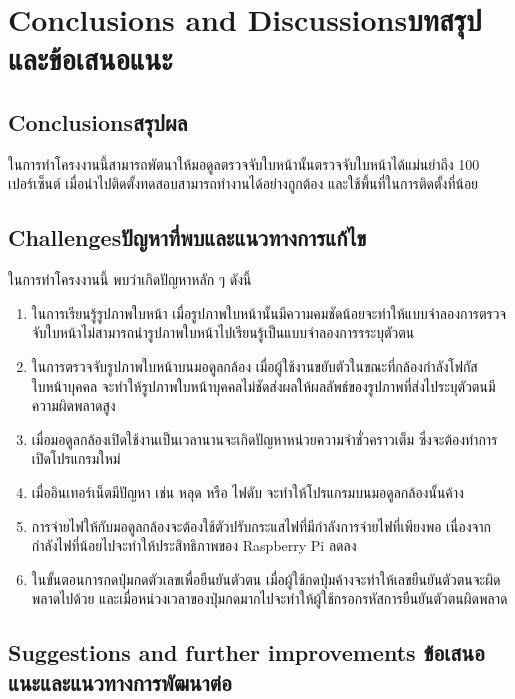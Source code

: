 \chapter{\ifenglish Conclusions and Discussions\else บทสรุปและข้อเสนอแนะ\fi}

\section{\ifenglish Conclusions\else สรุปผล\fi}

ในการทำโครงงานนี้สามารถพัตนาให้มอดูลตรวจจับใบหน้านั้นตรวจจับใบหน้าได้แม่นยำถึง 100 เปอร์เซ็นต์ เมื่อนำไปติดตั้งทดสอบสามารถทำงานได้อย่างถูกต้อง
และใช้พึ้นที่ในการติดตั้งที่น้อย


\section{\ifenglish Challenges\else ปัญหาที่พบและแนวทางการแก้ไข\fi}

ในการทำโครงงานนี้ พบว่าเกิดปัญหาหลัก ๆ ดังนี้
\begin{enumerate}
    \item ในการเรียนรู้รูปภาพใบหน้า เมื่อรูปภาพใบหน้านั้นมีความคมชัดน้อยจะทำให้แบบจำลองการตรวจจับใบหน้าไม่สามารถนำรูปภาพใบหน้าไปเรียนรู้เป็นแบบจำลองการรระบุตัวตน
    \item ในการตรวจจับรูปภาพใบหน้าบนมอดูลกล้อง เมื่อผู้ใช้งานขยับตัวในขณะที่กล้องกำลังโฟกัสใบหน้าบุคคล จะทำให้รูปภาพใบหน้าบุคคลไม่ชัดส่งผลให้ผลลัพธ์ของรูปภาพที่ส่งไประบุตัวตนมีความผิดพลาดสูง
    \item เมื่อมอดูลกล้องเปิดใช้งานเป็นเวลานานจะเกิดปัญหาหน่วยความจำชั่วคราวเต็ม ซึ่งจะต้องทำการเปิดโปรแกรมใหม่
    \item เมื่ออินเทอร์เน็ตมีปัญหา เช่น หลุด หรือ ไฟดับ จะทำให้โปรแกรมบนมอดูลกล้องนั้นค้าง
    \item การจ่ายไฟให้กับมอดูลกล้องจะต้องใช้ตัวปรับกระแสไฟที่มีกำลังการจ่ายไฟที่เพียงพอ เนื่องจากกำลังไฟที่น้อยไปจะทำให้ประสิทธิภาพของ Raspberry Pi ลดลง
    \item ในขั้นตอนการกดปุ่มกดตัวเลขเพื่อยืนยันตัวตน เมื่อผู้ใช้กดปุ่มค้างจะทำให้เลขยืนยันตัวตนจะผิดพลาดไปด้วย และเมื่อหน่วงเวลาของปุ่มกดมากไปจะทำให้ผู้ใช้กรอกรหัสการยืนยันตัวตนผิดพลาด
\end{enumerate}



\section{\ifenglish%
Suggestions and further improvements
\else%
ข้อเสนอแนะและแนวทางการพัฒนาต่อ
\fi
}

